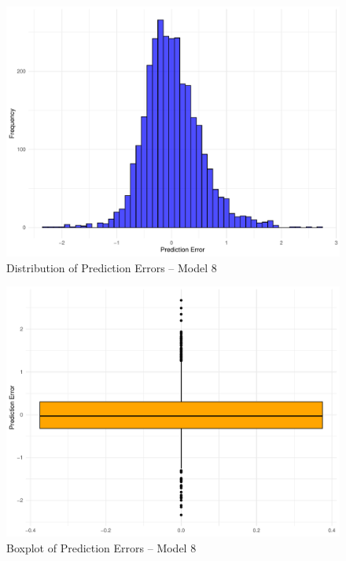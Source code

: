 \documentclass[11pt,a4paper,onecolumn]{article}
\begin{document}
        \begin{figure}[H]
            \includegraphics[scale=0.6]{../views/P7_prediction_errors_hist.pdf}   
            \caption{Distribution of Prediction Errors -- Model 8} \label{fig:P7}
        \end{figure}
    
        \begin{figure}[H]
            \includegraphics[scale=0.6]{../views/P8_prediction_errors_box.pdf}   
            \caption{Boxplot of Prediction Errors -- Model 8} \label{fig:P8}
        \end{figure}
\end{document}
